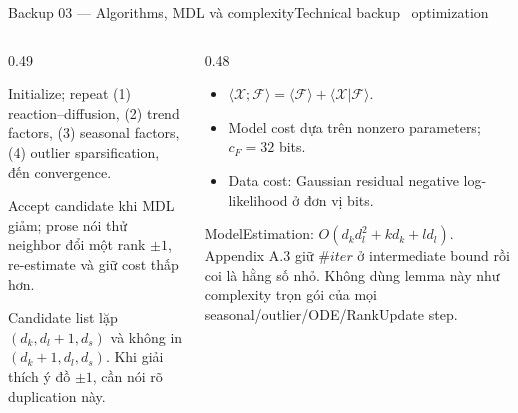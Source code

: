 \documentclass[aspectratio=169,11pt]{beamer}
\begin{document}
\begin{frame}[shrink=28]{Backup 03 --- Algorithms, MDL và complexity}{Technical backup \textperiodcentered\ optimization}
\begin{columns}[T,onlytextwidth]
\begin{column}{0.49\textwidth}
\begin{mathcard}
  Initialize; repeat (1) reaction--diffusion, (2) trend factors, (3) seasonal factors, (4) outlier sparsification, đến convergence.
\end{mathcard}
\vspace{3mm}
\begin{intuition}
  Accept candidate khi MDL giảm; prose nói thử neighbor đổi một rank $\pm1$, re-estimate và giữ cost thấp hơn.
\end{intuition}
\vspace{3mm}
\begin{caution}
  Candidate list lặp $(d_k,d_l+1,d_s)$ và không in $(d_k+1,d_l,d_s)$. Khi giải thích ý đồ $\pm1$, cần nói rõ duplication này.
\end{caution}
\end{column}
\begin{column}{0.48\textwidth}
\begin{mathcard}
  \begin{itemize}
    \item $\langle\mathcal X;\mathcal F\rangle=\langle\mathcal F\rangle+\langle\mathcal X|\mathcal F\rangle$.
    \item Model cost dựa trên nonzero parameters; $c_F=32$ bits.
    \item Data cost: Gaussian residual negative log-likelihood ở đơn vị bits.
  \end{itemize}
\end{mathcard}
\vspace{3mm}
\begin{questioncard}
  \par
  ModelEstimation: $O(d_kd_l^2+kd_k+ld_l)$. Appendix A.3 giữ $\#iter$ ở intermediate bound rồi coi là hằng số nhỏ. Không dùng lemma này như complexity trọn gói của mọi seasonal/outlier/ODE/RankUpdate step.
\end{questioncard}
\end{column}
\end{columns}
\vspace{2mm}
\end{frame}
\end{document}
